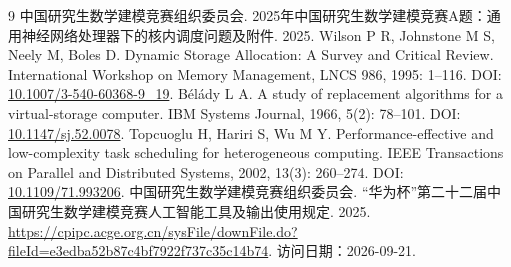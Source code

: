 \begin{thebibliography}{9}
 中国研究生数学建模竞赛组织委员会. 2025年中国研究生数学建模竞赛A题：通用神经网络处理器下的核内调度问题及附件. 2025.
 Wilson P R, Johnstone M S, Neely M, Boles D. Dynamic Storage Allocation: A Survey and Critical Review. International Workshop on Memory Management, LNCS 986, 1995: 1--116. DOI: \url{10.1007/3-540-60368-9_19}.
 Bélády L A. A study of replacement algorithms for a virtual-storage computer. IBM Systems Journal, 1966, 5(2): 78--101. DOI: \url{10.1147/sj.52.0078}.
 Topcuoglu H, Hariri S, Wu M Y. Performance-effective and low-complexity task scheduling for heterogeneous computing. IEEE Transactions on Parallel and Distributed Systems, 2002, 13(3): 260--274. DOI: \url{10.1109/71.993206}.
 中国研究生数学建模竞赛组织委员会. “华为杯”第二十二届中国研究生数学建模竞赛人工智能工具及输出使用规定. 2025. \url{https://cpipc.acge.org.cn/sysFile/downFile.do?fileId=e3edba52b87c4bf7922f737c35c14b74}. 访问日期：2026-09-21.
\end{thebibliography}
